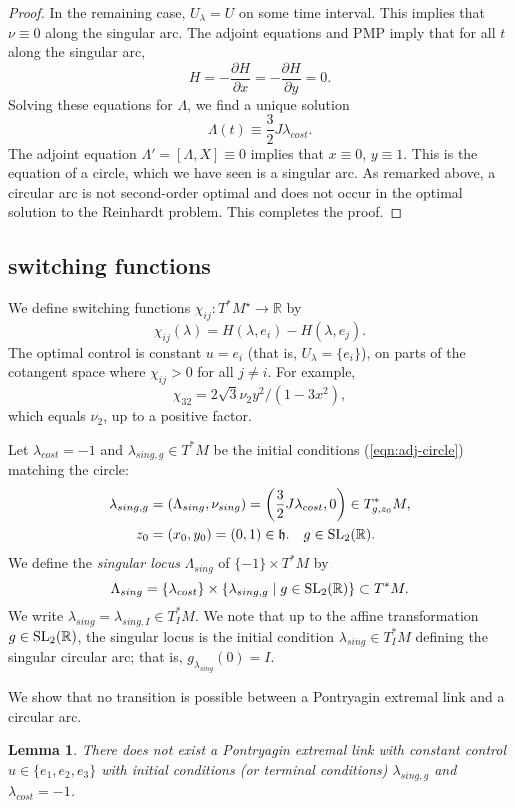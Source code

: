 \documentclass{article}
\newtheorem{lemma}[theorem]{Lemma}
\theoremstyle{remark}
\newcommand{\ring}[1]{\mathbb{#1}}
\newcommand{\op}[1]{\hbox{#1}}
\def\SL{\op{SL}_2(\ring{R})}
\def\h{\mathfrak h}
\def\Mstar{M^\star}
\newcommand\Lsing{\Lambda_{sing}}
\newcommand\lsing{\lambda_{sing}}
\newcommand{\partials}[2]{\frac{\partial #1}{\partial #2}}
\begin{document}
\begin{proof}
In the remaining case, $U_\lambda = U$ on some time interval.
This implies that $\nu \equiv 0$
along the singular arc.  The adjoint equations and PMP imply that for
all $t$ along the singular arc,
\[
H =  -\partials {H}{ x} = -\partials {H}{y} =0.
\]
Solving these equations for $\Lambda$, we find a unique solution
\[
\Lambda(t) \equiv \frac{3}{2} J \lambda_{cost}.
\]
The adjoint equation $\Lambda' = [\Lambda,X]\equiv 0$ implies that
$x\equiv 0$, $y\equiv 1$.  This is the equation of a circle, which we
have seen is a singular arc.  As remarked above, a circular arc is not
second-order optimal and does not occur in the optimal solution to the
Reinhardt problem.
This completes the proof.
\end{proof}


\subsection{switching functions}

We define switching functions $\chi_{ij}:T^*\Mstar\to \ring{R}$ by
\[
\chi_{ij} (\lambda) = H(\lambda,e_i) - H(\lambda,e_j).
\]
The optimal control is constant $u=e_i$ (that is, $U_\lambda=\{e_i\}$), 
on parts of the cotangent
space where $\chi_{ij}>0$ for all $j\ne i$.  For example,
\[
\chi_{32} = 2\sqrt{3} \nu_2 y^2/(1- 3 x^2),
\]
which equals $\nu_2$, up to a positive factor.

Let $\lambda_{cost}=-1$ and
$\lambda_{sing,g}\in T^*M$
be the initial conditions (\ref{eqn:adj-circle}) matching the circle:
\begin{align*}
\lambda_{sing,g}&=(\Lambda_{sing},\nu_{sing}) = \left(
\frac{3}{2} J\lambda_{cost},0\right)\in T_{g,z_0}^*M,
\\
z_0&= (x_0,y_0) = (0,1)\in\h.
\quad g\in\SL.
\end{align*}
We define the {\it singular locus} $\Lsing$ of $\{-1\}\times T^*M$ by
\begin{equation}
\Lsing= \{\lambda_{cost}\}\times \{\lambda_{sing,g}\mid g\in \SL\}\subset
 T^*M.
\end{equation}
We write $\lsing=\lambda_{sing,I}\in T_I^*M$.  We note that up to the
affine transformation $g\in \SL$, the singular locus is the initial
condition $\lsing\in T_I^*M$ defining the singular circular arc; that
is, $g_{\lsing}(0)=I$.

We show that no transition is possible between a Pontryagin extremal
link and a circular arc.  


\begin{lemma} There does not exist a Pontryagin extremal link with
  constant control $u\in\{e_1,e_2,e_3\}$ with initial conditions (or terminal conditions)
$\lambda_{sing,g}$ and $\lambda_{cost}=-1$. 
\end{lemma}
\end{document}
